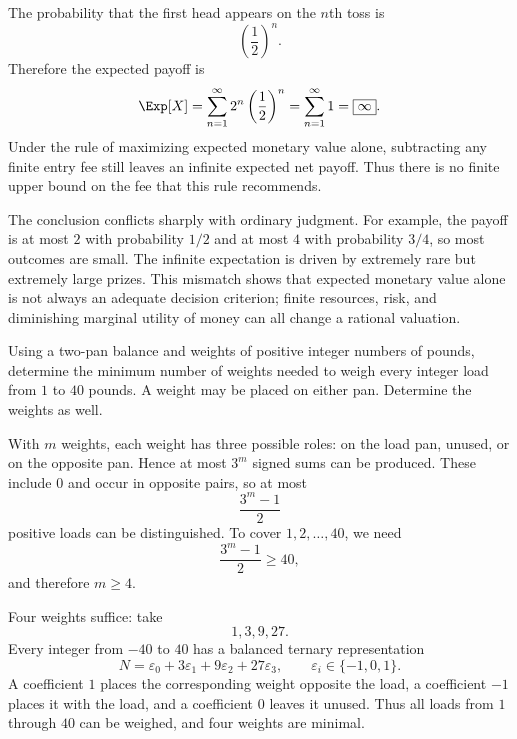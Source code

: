     \begin{solution}
        The probability that the first head appears on the $n$th toss is
        \[
            \left(\frac12\right)^n.
        \]
        Therefore the expected payoff is
        \[
            \Exp[X]
            =
            \sum_{n=1}^{\infty}
            2^n\left(\frac12\right)^n
            =
            \sum_{n=1}^{\infty}1
            =
            \boxed{\infty}.
        \]
        Under the rule of maximizing expected monetary value alone, subtracting
        any finite entry fee still leaves an infinite expected net payoff.
        Thus there is no finite upper bound on the fee that this rule recommends.

        The conclusion conflicts sharply with ordinary judgment. For example,
        the payoff is at most $2$ with probability $1/2$ and at most $4$ with
        probability $3/4$, so most outcomes are small. The infinite expectation
        is driven by extremely rare but extremely large prizes. This mismatch
        shows that expected monetary value alone is not always an adequate
        decision criterion; finite resources, risk, and diminishing marginal
        utility of money can all change a rational valuation.
    \end{solution}

    \begin{expectedproblem}
        Using a two-pan balance and weights of positive integer numbers of
        pounds, determine the minimum number of weights needed to weigh every
        integer load from $1$ to $40$ pounds. A weight may be placed on either
        pan. Determine the weights as well.
    \end{expectedproblem}

    \begin{solution}
        With $m$ weights, each weight has three possible roles: on the load pan,
        unused, or on the opposite pan. Hence at most $3^m$ signed sums can be
        produced. These include $0$ and occur in opposite pairs, so at most
        \[
            \frac{3^m-1}{2}
        \]
        positive loads can be distinguished. To cover $1,2,\ldots,40$, we need
        \[
            \frac{3^m-1}{2}\geq40,
        \]
        and therefore $m\geq4$.

        Four weights suffice: take
        \[
            \boxed{1,3,9,27}.
        \]
        Every integer from $-40$ to $40$ has a balanced ternary representation
        \[
            N=\varepsilon_0+3\varepsilon_1+9\varepsilon_2+27\varepsilon_3,
            \qquad
            \varepsilon_i\in\{-1,0,1\}.
        \]
        A coefficient $1$ places the corresponding weight opposite the load,
        a coefficient $-1$ places it with the load, and a coefficient $0$
        leaves it unused. Thus all loads from $1$ through $40$ can be weighed,
        and four weights are minimal.
    \end{solution}

